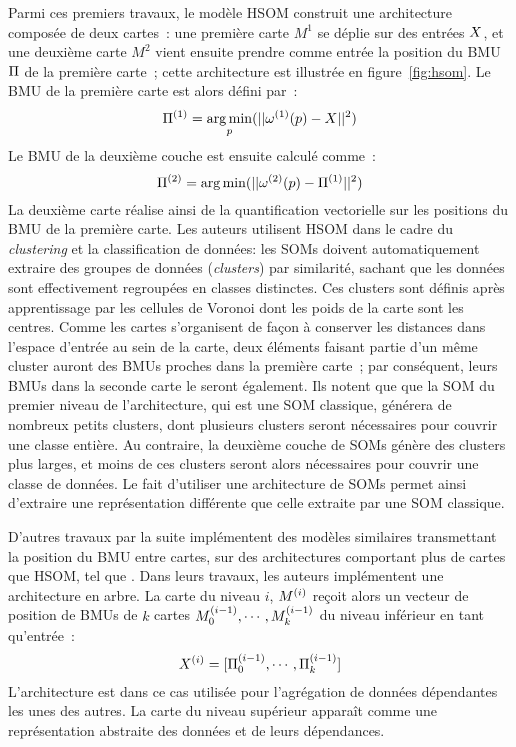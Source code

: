\documentclass[../main]{subfiles}
\begin{document}
Parmi ces premiers travaux, le modèle HSOM \cite{lampinen_clustering_1992} construit une architecture composée de deux cartes~: une première carte $M^1$ se déplie sur des entrées $X$, et une deuxième carte $M^2$ vient ensuite prendre comme entrée la position du BMU $\Pi$ de la première carte~; cette architecture est illustrée en figure~\ref{fig:hsom}.
Le BMU de la première carte est alors défini par~:
$$ \Pi^{({1})} = \operatorname*{arg\,min}_p(||\omega^{({1})}(p) - X || ^2)$$
Le BMU de la deuxième couche est ensuite calculé comme~:
$$ \Pi^{({2})}= \operatorname*{arg\,min}(||\omega^{({2})}(p) - \Pi^{({1})} || ^2)$$
La deuxième carte réalise ainsi de la quantification vectorielle sur les positions du BMU de la première carte. Les auteurs utilisent HSOM dans le cadre du \emph{clustering} et la classification de données: les SOMs doivent automatiquement extraire des groupes de données (\emph{clusters}) par similarité, sachant que les données sont effectivement regroupées en classes distinctes. Ces clusters sont définis après apprentissage par les cellules de Voronoi dont les poids de la carte sont les centres.
Comme les cartes s'organisent de façon à conserver les distances dans l'espace d'entrée au sein de la carte, deux éléments faisant partie d'un même cluster auront des BMUs proches dans la première carte~; par conséquent, leurs BMUs dans la seconde carte le seront également. 
Ils notent que que la SOM du premier niveau de l'architecture, qui est une SOM classique, générera de nombreux petits clusters, dont plusieurs clusters seront nécessaires pour couvrir une classe entière. Au contraire, la deuxième couche de SOMs génère des clusters plus larges, et moins de ces clusters seront alors nécessaires pour couvrir une classe de données.
Le fait d'utiliser une architecture de SOMs permet ainsi d'extraire une représentation différente que celle extraite par une SOM classique.


D'autres travaux par la suite implémentent des modèles similaires transmettant la position du BMU entre cartes, sur des architectures comportant plus de cartes que HSOM, tel que \cite{hagenauer_hierarchical_2013, Paplinski2005MultimodalFS}.
Dans leurs travaux, les auteurs implémentent une architecture en arbre. La carte du niveau $i$, $M^{({i})}$ reçoit alors un vecteur de position de BMUs de $k$ cartes $M_0^{({i-1})}, \cdots, M_k^{({i-1})}$  du niveau inférieur en tant qu'entrée~:
$$ X^{({i})} = [\Pi_0^{({i-1})}, \cdots, \Pi_k^{({i-1})}]$$
L'architecture est dans ce cas utilisée pour l'agrégation de données dépendantes les unes des autres.
La carte du niveau supérieur apparaît comme une représentation abstraite des données et de leurs dépendances.
\end{document}
